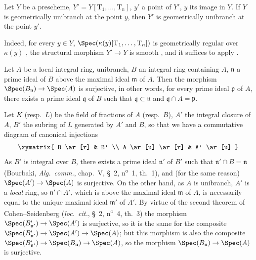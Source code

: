 \begin{lemma}[14.4.1.1]
\label{IV.14.4.1.1}
Let $Y$ be a prescheme, $Y'=Y[\mathrm{T}_1,\ldots,\mathrm{T}_n]$, $y'$ a point of $Y'$, $y$ its image in $Y$.
If $Y$ is geometrically unibranch at the point $y$, then $Y'$ is geometrically unibranch at the point $y'$.
\end{lemma}

Indeed, for every $y\in Y$, $\Spec(\kappa(y)[\mathrm{T}_1,\ldots,\mathrm{T}_n])$ is geometrically regular over $\kappa(y)$ , the structural morphism $Y'\to Y$ is smooth , and it suffices to apply .

\begin{lemma}[14.4.1.2]
\label{IV.14.4.1.2}
Let $A$ be a local integral ring, unibranch, $B$ an integral ring containing $A$, $\mathfrak{n}$ a prime ideal of $B$ above the maximal ideal $\mathfrak{m}$ of $A$.
Then the morphism $\Spec(B_\mathfrak{n})\to\Spec(A)$ is surjective, in other words, for every prime ideal $\mathfrak{p}$ of $A$, there exists a prime ideal $\mathfrak{q}$ of $B$ such that $\mathfrak{q}\subset\mathfrak{n}$ and $\mathfrak{q}\cap A=\mathfrak{p}$.
\end{lemma}

Let $K$ (resp.\ $L$) be the field of fractions of $A$ (resp.\ $B$), $A'$ the integral closure of $A$, $B'$ the subring of $L$ generated by $A'$ and $B$, so that we have a commutative diagram of canonical injections
\[
  \xymatrix{
    B \ar[r] & B' \\
    A \ar[u] \ar[r] & A' \ar[u]
  }
\]
As $B'$ is integral over $B$, there exists a prime ideal $\mathfrak{n}'$ of $B'$ such that $\mathfrak{n}'\cap B=\mathfrak{n}$ (Bourbaki, \emph{Alg.\ comm.}, chap.~V, \S~2, n\textsuperscript{o}~1, th.~1), and (for the same reason) $\Spec(A')\to\Spec(A)$ is surjective.
On the other hand, as $A$ is unibranch, $A'$ is a \emph{local} ring, so $\mathfrak{n}'\cap A'$, which is above the maximal ideal $\mathfrak{m}$ of $A$, is necessarily equal to the unique maximal ideal $\mathfrak{m}'$ of $A'$.
By virtue of the second theorem of Cohen--Seidenberg (\emph{loc.\ cit.}, \S~2, n\textsuperscript{o}~4, th.~3) the morphism $\Spec(B'_{\mathfrak{n}'})\to\Spec(A')$ is surjective, so it is the same for the composite $\Spec(B'_{\mathfrak{n}'})\to\Spec(A')\to\Spec(A)$; but this morphism is also the composite $\Spec(B'_{\mathfrak{n}'})\to\Spec(B_\mathfrak{n})\to\Spec(A)$, so the morphism $\Spec(B_\mathfrak{n})\to\Spec(A)$ is surjective.

